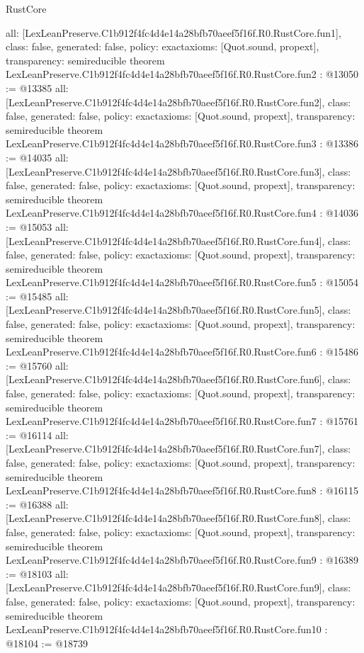 \begin{lexlean}{RustCore}
\begin{coremodule}
{  all: [LexLeanPreserve.C1b912f4fc4d4e14a28bfb70aeef5f16f.R0.RustCore.fun1],
  class: false,
  generated: false,
  policy: exact{axioms: [Quot.sound, propext]},
  transparency: semireducible
}
theorem LexLeanPreserve.C1b912f4fc4d4e14a28bfb70aeef5f16f.R0.RustCore.fun2 : @13050 := @13385 {
  all: [LexLeanPreserve.C1b912f4fc4d4e14a28bfb70aeef5f16f.R0.RustCore.fun2],
  class: false,
  generated: false,
  policy: exact{axioms: [Quot.sound, propext]},
  transparency: semireducible
}
theorem LexLeanPreserve.C1b912f4fc4d4e14a28bfb70aeef5f16f.R0.RustCore.fun3 : @13386 := @14035 {
  all: [LexLeanPreserve.C1b912f4fc4d4e14a28bfb70aeef5f16f.R0.RustCore.fun3],
  class: false,
  generated: false,
  policy: exact{axioms: [Quot.sound, propext]},
  transparency: semireducible
}
theorem LexLeanPreserve.C1b912f4fc4d4e14a28bfb70aeef5f16f.R0.RustCore.fun4 : @14036 := @15053 {
  all: [LexLeanPreserve.C1b912f4fc4d4e14a28bfb70aeef5f16f.R0.RustCore.fun4],
  class: false,
  generated: false,
  policy: exact{axioms: [Quot.sound, propext]},
  transparency: semireducible
}
theorem LexLeanPreserve.C1b912f4fc4d4e14a28bfb70aeef5f16f.R0.RustCore.fun5 : @15054 := @15485 {
  all: [LexLeanPreserve.C1b912f4fc4d4e14a28bfb70aeef5f16f.R0.RustCore.fun5],
  class: false,
  generated: false,
  policy: exact{axioms: [Quot.sound, propext]},
  transparency: semireducible
}
theorem LexLeanPreserve.C1b912f4fc4d4e14a28bfb70aeef5f16f.R0.RustCore.fun6 : @15486 := @15760 {
  all: [LexLeanPreserve.C1b912f4fc4d4e14a28bfb70aeef5f16f.R0.RustCore.fun6],
  class: false,
  generated: false,
  policy: exact{axioms: [Quot.sound, propext]},
  transparency: semireducible
}
theorem LexLeanPreserve.C1b912f4fc4d4e14a28bfb70aeef5f16f.R0.RustCore.fun7 : @15761 := @16114 {
  all: [LexLeanPreserve.C1b912f4fc4d4e14a28bfb70aeef5f16f.R0.RustCore.fun7],
  class: false,
  generated: false,
  policy: exact{axioms: [Quot.sound, propext]},
  transparency: semireducible
}
theorem LexLeanPreserve.C1b912f4fc4d4e14a28bfb70aeef5f16f.R0.RustCore.fun8 : @16115 := @16388 {
  all: [LexLeanPreserve.C1b912f4fc4d4e14a28bfb70aeef5f16f.R0.RustCore.fun8],
  class: false,
  generated: false,
  policy: exact{axioms: [Quot.sound, propext]},
  transparency: semireducible
}
theorem LexLeanPreserve.C1b912f4fc4d4e14a28bfb70aeef5f16f.R0.RustCore.fun9 : @16389 := @18103 {
  all: [LexLeanPreserve.C1b912f4fc4d4e14a28bfb70aeef5f16f.R0.RustCore.fun9],
  class: false,
  generated: false,
  policy: exact{axioms: [Quot.sound, propext]},
  transparency: semireducible
}
theorem LexLeanPreserve.C1b912f4fc4d4e14a28bfb70aeef5f16f.R0.RustCore.fun10 : @18104 := @18739 {
}
\end{coremodule}
\end{lexlean}
